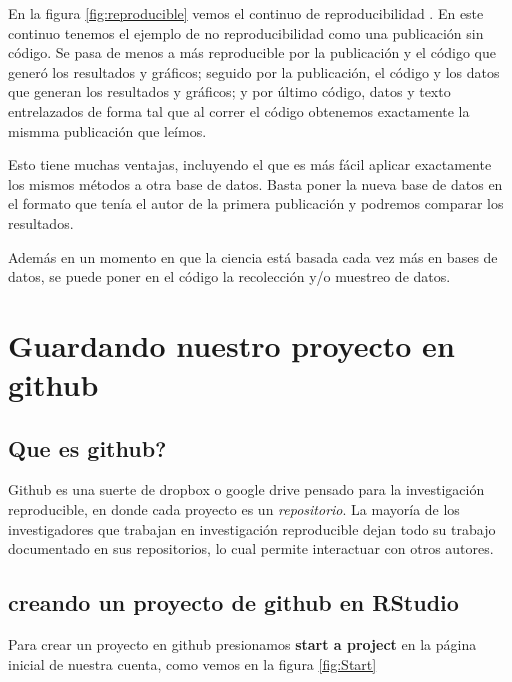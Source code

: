 \documentclass[]{book}
\begin{document}
En la figura \ref{fig:reproducible} vemos el continuo de
reproducibilidad \citep{peng2011reproducible}. En este continuo tenemos
el ejemplo de no reproducibilidad como una publicación sin código. Se
pasa de menos a más reproducible por la publicación y el código que
generó los resultados y gráficos; seguido por la publicación, el código
y los datos que generan los resultados y gráficos; y por último código,
datos y texto entrelazados de forma tal que al correr el código
obtenemos exactamente la mismma publicación que leímos.

Esto tiene muchas ventajas, incluyendo el que es más fácil aplicar
exactamente los mismos métodos a otra base de datos. Basta poner la
nueva base de datos en el formato que tenía el autor de la primera
publicación y podremos comparar los resultados.

Además en un momento en que la ciencia está basada cada vez más en bases
de datos, se puede poner en el código la recolección y/o muestreo de
datos.

\hypertarget{guardando-nuestro-proyecto-en-github}{%
\section{Guardando nuestro proyecto en
github}\label{guardando-nuestro-proyecto-en-github}}

\hypertarget{que-es-github}{%
\subsection{Que es github?}\label{que-es-github}}

Github es una suerte de dropbox o google drive pensado para la
investigación reproducible, en donde cada proyecto es un
\emph{repositorio}. La mayoría de los investigadores que trabajan en
investigación reproducible dejan todo su trabajo documentado en sus
repositorios, lo cual permite interactuar con otros autores.

\hypertarget{creando-un-proyecto-de-github-en-rstudio}{%
\subsection{creando un proyecto de github en
RStudio}\label{creando-un-proyecto-de-github-en-rstudio}}

Para crear un proyecto en github presionamos \textbf{start a project} en
la página inicial de nuestra cuenta, como vemos en la figura
\ref{fig:Start}
\end{document}
